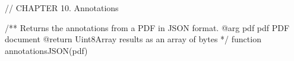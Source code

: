 // CHAPTER 10. Annotations 

/** Returns the annotations from a PDF in JSON format.
@arg {pdf} pdf PDF document
@return {Uint8Array} results as an array of bytes */
function annotationsJSON(pdf) {}

